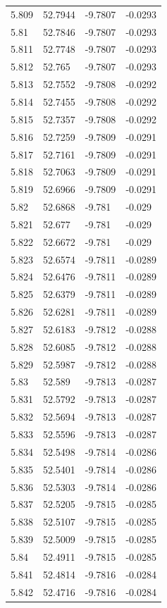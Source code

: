 \begin{tabular}{llll}
5.809 & 52.7944 & -9.7807 & -0.0293 \\
5.81 & 52.7846 & -9.7807 & -0.0293 \\
5.811 & 52.7748 & -9.7807 & -0.0293 \\
5.812 & 52.765 & -9.7807 & -0.0293 \\
5.813 & 52.7552 & -9.7808 & -0.0292 \\
5.814 & 52.7455 & -9.7808 & -0.0292 \\
5.815 & 52.7357 & -9.7808 & -0.0292 \\
5.816 & 52.7259 & -9.7809 & -0.0291 \\
5.817 & 52.7161 & -9.7809 & -0.0291 \\
5.818 & 52.7063 & -9.7809 & -0.0291 \\
5.819 & 52.6966 & -9.7809 & -0.0291 \\
5.82 & 52.6868 & -9.781 & -0.029 \\
5.821 & 52.677 & -9.781 & -0.029 \\
5.822 & 52.6672 & -9.781 & -0.029 \\
5.823 & 52.6574 & -9.7811 & -0.0289 \\
5.824 & 52.6476 & -9.7811 & -0.0289 \\
5.825 & 52.6379 & -9.7811 & -0.0289 \\
5.826 & 52.6281 & -9.7811 & -0.0289 \\
5.827 & 52.6183 & -9.7812 & -0.0288 \\
5.828 & 52.6085 & -9.7812 & -0.0288 \\
5.829 & 52.5987 & -9.7812 & -0.0288 \\
5.83 & 52.589 & -9.7813 & -0.0287 \\
5.831 & 52.5792 & -9.7813 & -0.0287 \\
5.832 & 52.5694 & -9.7813 & -0.0287 \\
5.833 & 52.5596 & -9.7813 & -0.0287 \\
5.834 & 52.5498 & -9.7814 & -0.0286 \\
5.835 & 52.5401 & -9.7814 & -0.0286 \\
5.836 & 52.5303 & -9.7814 & -0.0286 \\
5.837 & 52.5205 & -9.7815 & -0.0285 \\
5.838 & 52.5107 & -9.7815 & -0.0285 \\
5.839 & 52.5009 & -9.7815 & -0.0285 \\
5.84 & 52.4911 & -9.7815 & -0.0285 \\
5.841 & 52.4814 & -9.7816 & -0.0284 \\
5.842 & 52.4716 & -9.7816 & -0.0284 \\

\end{tabular}
